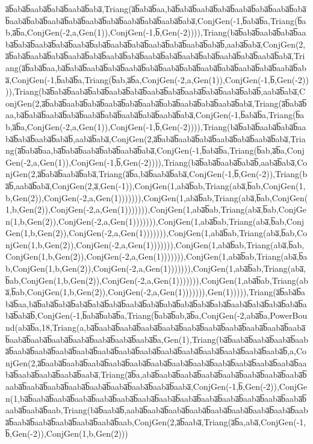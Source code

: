 a̅b̅aba̅b̅aaba̅b̅aba̅b̅aaba̅b̅aba̅,Triang(a̅b̅aba̅b̅aa,ba̅b̅aba̅b̅aaba̅b̅aba̅b̅aaba̅b̅aba̅b̅aaba̅b̅aba̅b̅aaba̅b̅aba̅b̅aaba̅b̅aba̅b̅aaba̅b̅aba̅b̅aaba̅b̅aba̅b̅aaba̅b̅aba̅,ConjGen(-1,b̅aba̅b̅a,Triang(b̅ab,a̅b̅a,ConjGen(-2,a,Gen(1)),ConjGen(-1,b̅,Gen(-2)))),Triang(ba̅b̅aba̅b̅aaba̅b̅aba̅b̅aaba̅b̅aba̅b̅aaba̅b̅aba̅b̅aaba̅b̅aba̅b̅aaba̅b̅aba̅b̅aaba̅b̅aba̅b̅aaba̅b̅aba̅b̅,aaba̅b̅aba̅,ConjGen(2,a̅b̅aba̅b̅aaba̅b̅aba̅b̅aaba̅b̅aba̅b̅aaba̅b̅aba̅b̅aaba̅b̅aba̅b̅aaba̅b̅aba̅b̅aaba̅b̅aba̅b̅aaba̅b̅aba̅,Triang(a̅b̅aba̅b̅aa,ba̅b̅aba̅b̅aaba̅b̅aba̅b̅aaba̅b̅aba̅b̅aaba̅b̅aba̅b̅aaba̅b̅aba̅b̅aaba̅b̅aba̅b̅aaba̅b̅aba̅,ConjGen(-1,b̅aba̅b̅a,Triang(b̅ab,a̅b̅a,ConjGen(-2,a,Gen(1)),ConjGen(-1,b̅,Gen(-2)))),Triang(ba̅b̅aba̅b̅aaba̅b̅aba̅b̅aaba̅b̅aba̅b̅aaba̅b̅aba̅b̅aaba̅b̅aba̅b̅aaba̅b̅aba̅b̅,aaba̅b̅aba̅,ConjGen(2,a̅b̅aba̅b̅aaba̅b̅aba̅b̅aaba̅b̅aba̅b̅aaba̅b̅aba̅b̅aaba̅b̅aba̅b̅aaba̅b̅aba̅,Triang(a̅b̅aba̅b̅aa,ba̅b̅aba̅b̅aaba̅b̅aba̅b̅aaba̅b̅aba̅b̅aaba̅b̅aba̅b̅aaba̅b̅aba̅,ConjGen(-1,b̅aba̅b̅a,Triang(b̅ab,a̅b̅a,ConjGen(-2,a,Gen(1)),ConjGen(-1,b̅,Gen(-2)))),Triang(ba̅b̅aba̅b̅aaba̅b̅aba̅b̅aaba̅b̅aba̅b̅aaba̅b̅aba̅b̅,aaba̅b̅aba̅,ConjGen(2,a̅b̅aba̅b̅aaba̅b̅aba̅b̅aaba̅b̅aba̅b̅aaba̅b̅aba̅,Triang(a̅b̅aba̅b̅aa,ba̅b̅aba̅b̅aaba̅b̅aba̅b̅aaba̅b̅aba̅,ConjGen(-1,b̅aba̅b̅a,Triang(b̅ab,a̅b̅a,ConjGen(-2,a,Gen(1)),ConjGen(-1,b̅,Gen(-2)))),Triang(ba̅b̅aba̅b̅aaba̅b̅aba̅b̅,aaba̅b̅aba̅,ConjGen(2,a̅b̅aba̅b̅aaba̅b̅aba̅,Triang(a̅b̅a,ba̅b̅aaba̅b̅aba̅,ConjGen(-1,b̅,Gen(-2)),Triang(ba̅b̅,aaba̅b̅aba̅,ConjGen(2,a̅,Gen(-1)),ConjGen(1,aba̅b̅ab,Triang(aba̅,b̅ab,ConjGen(1,b,Gen(2)),ConjGen(-2,a,Gen(1))))))),ConjGen(1,aba̅b̅ab,Triang(aba̅,b̅ab,ConjGen(1,b,Gen(2)),ConjGen(-2,a,Gen(1))))))),ConjGen(1,aba̅b̅ab,Triang(aba̅,b̅ab,ConjGen(1,b,Gen(2)),ConjGen(-2,a,Gen(1))))))),ConjGen(1,aba̅b̅ab,Triang(aba̅,b̅ab,ConjGen(1,b,Gen(2)),ConjGen(-2,a,Gen(1))))))),ConjGen(1,aba̅b̅ab,Triang(aba̅,b̅ab,ConjGen(1,b,Gen(2)),ConjGen(-2,a,Gen(1))))))),ConjGen(1,aba̅b̅ab,Triang(aba̅,b̅ab,ConjGen(1,b,Gen(2)),ConjGen(-2,a,Gen(1))))))),ConjGen(1,aba̅b̅ab,Triang(aba̅,b̅ab,ConjGen(1,b,Gen(2)),ConjGen(-2,a,Gen(1))))))),ConjGen(1,aba̅b̅ab,Triang(aba̅,b̅ab,ConjGen(1,b,Gen(2)),ConjGen(-2,a,Gen(1))))))),ConjGen(1,aba̅b̅ab,Triang(aba̅,b̅ab,ConjGen(1,b,Gen(2)),ConjGen(-2,a,Gen(1))))))),Gen(1))))),Triang(a̅b̅aba̅b̅aba̅b̅aa,ba̅b̅aba̅b̅aba̅b̅aba̅b̅aba̅b̅aba̅b̅aaba̅b̅aba̅b̅aba̅b̅aba̅b̅aba̅b̅aba̅b̅aaba̅b̅aba̅b̅aba̅b̅aba̅b̅aba̅b̅aba̅b̅,ConjGen(-1,b̅aba̅b̅aba̅b̅a,Triang(b̅aba̅b̅ab,a̅b̅a,ConjGen(-2,aba̅b̅a,PowerBound(aba̅b̅a,18,Triang(a,ba̅b̅aaba̅b̅aaba̅b̅aaba̅b̅aaba̅b̅aaba̅b̅aaba̅b̅aaba̅b̅aaba̅b̅aaba̅b̅aaba̅b̅aaba̅b̅aaba̅b̅aaba̅b̅aaba̅b̅aaba̅b̅aaba̅b̅aaba̅b̅a,Gen(1),Triang(ba̅b̅aaba̅b̅aaba̅b̅aaba̅b̅aaba̅b̅aaba̅b̅aaba̅b̅aaba̅b̅aaba̅b̅aaba̅b̅aaba̅b̅aaba̅b̅aaba̅b̅aaba̅b̅aaba̅b̅aaba̅b̅aaba̅b̅aaba̅b̅,a,ConjGen(2,a̅b̅aaba̅b̅aaba̅b̅aaba̅b̅aaba̅b̅aaba̅b̅aaba̅b̅aaba̅b̅aaba̅b̅aaba̅b̅aaba̅b̅aaba̅b̅aaba̅b̅aaba̅b̅aaba̅b̅aaba̅b̅aaba̅b̅aaba̅,Triang(a̅b̅a,aba̅b̅aaba̅b̅aaba̅b̅aaba̅b̅aaba̅b̅aaba̅b̅aaba̅b̅aaba̅b̅aaba̅b̅aaba̅b̅aaba̅b̅aaba̅b̅aaba̅b̅aaba̅b̅aaba̅b̅aaba̅b̅aaba̅,ConjGen(-1,b̅,Gen(-2)),ConjGen(1,ba̅b̅aaba̅b̅aaba̅b̅aaba̅b̅aaba̅b̅aaba̅b̅aaba̅b̅aaba̅b̅aaba̅b̅aaba̅b̅aaba̅b̅aaba̅b̅aaba̅b̅aaba̅b̅aaba̅b̅aaba̅b̅aab,Triang(ba̅b̅aaba̅b̅,aaba̅b̅aaba̅b̅aaba̅b̅aaba̅b̅aaba̅b̅aaba̅b̅aaba̅b̅aaba̅b̅aaba̅b̅aaba̅b̅aaba̅b̅aaba̅b̅aaba̅b̅aaba̅b̅aab,ConjGen(2,a̅b̅aaba̅,Triang(a̅b̅a,aba̅,ConjGen(-1,b̅,Gen(-2)),ConjGen(1,b,Gen(2)))